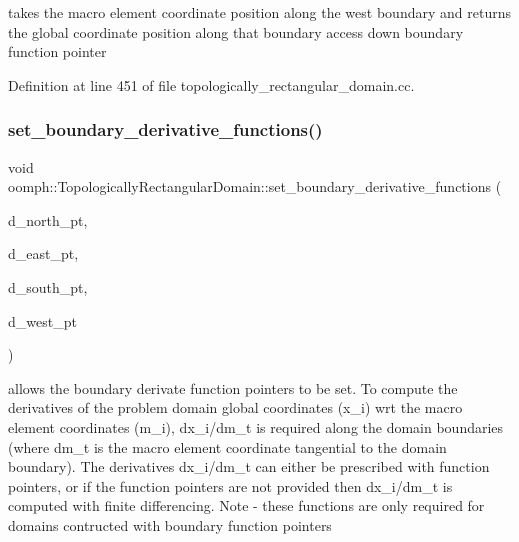 takes the macro element coordinate position along the west boundary and returns the global coordinate position along that boundary access down boundary function pointer 



Definition at line 451 of file topologically\+\_\+rectangular\+\_\+domain.\+cc.

\mbox{\label{classoomph_1_1TopologicallyRectangularDomain_a86e606d9635f02462fd4f1ef07cd09d4}} 
\subsubsection{\texorpdfstring{set\+\_\+boundary\+\_\+derivative\+\_\+functions()}{set\_boundary\_derivative\_functions()}}
{\footnotesize\ttfamily void oomph\+::\+Topologically\+Rectangular\+Domain\+::set\+\_\+boundary\+\_\+derivative\+\_\+functions (\begin{DoxyParamCaption}\item[{\hyperlink{classoomph_1_1TopologicallyRectangularDomain_a8b2e24f5500d86c93aef509c5410e7cc}{Boundary\+Fct\+Pt}}]{d\+\_\+north\+\_\+pt,  }\item[{\hyperlink{classoomph_1_1TopologicallyRectangularDomain_a8b2e24f5500d86c93aef509c5410e7cc}{Boundary\+Fct\+Pt}}]{d\+\_\+east\+\_\+pt,  }\item[{\hyperlink{classoomph_1_1TopologicallyRectangularDomain_a8b2e24f5500d86c93aef509c5410e7cc}{Boundary\+Fct\+Pt}}]{d\+\_\+south\+\_\+pt,  }\item[{\hyperlink{classoomph_1_1TopologicallyRectangularDomain_a8b2e24f5500d86c93aef509c5410e7cc}{Boundary\+Fct\+Pt}}]{d\+\_\+west\+\_\+pt }\end{DoxyParamCaption})}



allows the boundary derivate function pointers to be set. To compute the derivatives of the problem domain global coordinates (x\+\_\+i) wrt the macro element coordinates (m\+\_\+i), dx\+\_\+i/dm\+\_\+t is required along the domain boundaries (where dm\+\_\+t is the macro element coordinate tangential to the domain boundary). The derivatives dx\+\_\+i/dm\+\_\+t can either be prescribed with function pointers, or if the function pointers are not provided then dx\+\_\+i/dm\+\_\+t is computed with finite differencing. Note -\/ these functions are only required for domains contructed with boundary function pointers 



